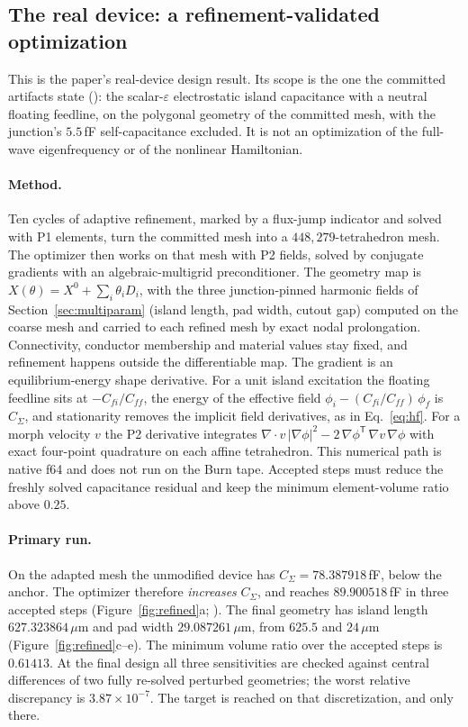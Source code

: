 \documentclass{anvil-paper}
\begin{document}
\subsection{The real device: a refinement-validated optimization}
\label{sec:refined}

This is the paper's real-device design result. Its scope is the one the
committed artifacts state
(): the
scalar-$\varepsilon$ electrostatic island capacitance with a neutral
floating feedline, on the polygonal geometry of the committed mesh,
with the junction's $5.5$\,fF self-capacitance excluded. It is not an
optimization of the full-wave eigenfrequency or of the nonlinear
Hamiltonian.

\paragraph{Method.}
Ten cycles of adaptive refinement, marked by a flux-jump indicator and
solved with P1 elements, turn the committed mesh into a
$448{,}279$-tetrahedron mesh. The optimizer then works on that mesh
with P2 fields, solved by conjugate gradients with an
algebraic-multigrid preconditioner. The geometry map is
$X(\theta) = X^0 + \sum_i \theta_i D_i$, with the three junction-pinned
harmonic fields of Section~\ref{sec:multiparam} (island length, pad
width, cutout gap) computed on the coarse mesh and carried to each
refined mesh by exact nodal prolongation. Connectivity, conductor
membership and material values stay fixed, and refinement happens
outside the differentiable map. The gradient is an equilibrium-energy
shape derivative. For a unit island excitation the floating feedline
sits at $-C_{fi}/C_{ff}$, the energy of the effective field
$\phi_i - (C_{fi}/C_{ff})\,\phi_f$ is $C_\Sigma$, and stationarity
removes the implicit field derivatives, as in Eq.~\eqref{eq:hf}. For a
morph velocity $v$ the P2 derivative integrates
$\nabla\!\cdot v\,\lvert\nabla\phi\rvert^2
 - 2\,\nabla\phi^{\mathsf T}\,\nabla v\,\nabla\phi$
with exact four-point quadrature on each affine tetrahedron. This numerical path is native f64 and does not run
on the Burn tape. Accepted steps must reduce the freshly solved
capacitance residual and keep the minimum element-volume ratio above
$0.25$.

\paragraph{Primary run.}
On the adapted mesh the unmodified device has $C_\Sigma =
78.387918$\,fF, below the anchor. The optimizer therefore
\emph{increases} $C_\Sigma$, and reaches $89.900518$\,fF in three
accepted steps (Figure~\ref{fig:refined}a;
).
The final geometry has island length $627.323864\,\mu$m and pad width
$29.087261\,\mu$m, from $625.5$ and $24\,\mu$m
(Figure~\ref{fig:refined}c--e). The minimum
volume ratio over the accepted steps is $0.61413$. At the final design
all three sensitivities are checked against central differences of two
fully re-solved perturbed geometries; the worst relative discrepancy is
$3.87\times10^{-7}$. The target is reached on that discretization, and
only there.
\end{document}
